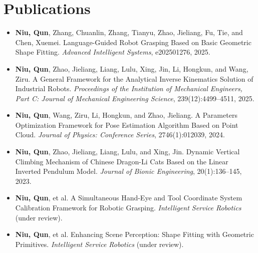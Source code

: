 \documentclass[11pt,a4paper]{article}
\begin{document}
\section*{Publications}
\begin{itemize}
	\item \textbf{Niu, Qun}, Zhang, Chuanlin, Zhang, Tianyu, Zhao, Jieliang, Fu, Tie, and Chen, Xuemei. Language-Guided Robot Grasping Based on Basic Geometric Shape Fitting. \textit{Advanced Intelligent Systems}, e202501276, 2025.
	\item \textbf{Niu, Qun}, Zhao, Jieliang, Liang, Lulu, Xing, Jin, Li, Hongkun, and Wang, Ziru. A General Framework for the Analytical Inverse Kinematics Solution of Industrial Robots. \textit{Proceedings of the Institution of Mechanical Engineers, Part C: Journal of Mechanical Engineering Science}, 239(12):4499--4511, 2025.
	\item \textbf{Niu, Qun}, Wang, Ziru, Li, Hongkun, and Zhao, Jieliang. A Parameters Optimization Framework for Pose Estimation Algorithm Based on Point Cloud. \textit{Journal of Physics: Conference Series}, 2746(1):012039, 2024.
	\item \textbf{Niu, Qun}, Zhao, Jieliang, Liang, Lulu, and Xing, Jin. Dynamic Vertical Climbing Mechanism of Chinese Dragon-Li Cats Based on the Linear Inverted Pendulum Model. \textit{Journal of Bionic Engineering}, 20(1):136--145, 2023.
	\item \textbf{Niu, Qun}, et al. A Simultaneous Hand-Eye and Tool Coordinate System Calibration Framework for Robotic Grasping. \textit{Intelligent Service Robotics} (under review).
	\item \textbf{Niu, Qun}, et al. Enhancing Scene Perception: Shape Fitting with Geometric Primitives. \textit{Intelligent Service Robotics} (under review).
\end{itemize}
\end{document}
